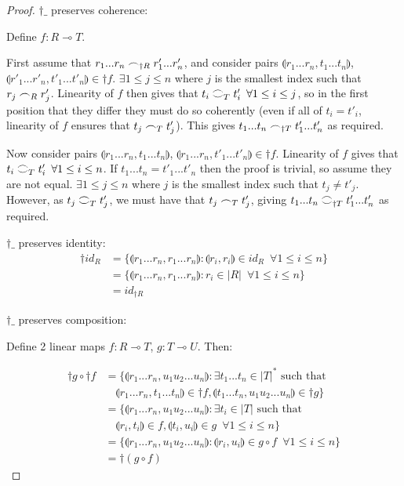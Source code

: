 \documentclass[11pt, oneside]{article}
\theoremstyle{plain}
\theoremstyle{definition}
\let\originaldagger\dagger
\renewcommand{\dag}{\mathord{\originaldagger}}
\newcommand{\lp}{\llparenthesis}
\newcommand{\rp}{\rrparenthesis}
\newcommand{\coh}[1][]{\mathrel{\vcenter{\offinterlineskip\hbox{$\frown$}\vskip0.2ex\hbox{$\smile$}}_{\ifx\\#1\\\else#1\fi}}}
\newcommand{\scoh}[1][]{\mathrel{\frown}_{\ifx\\#1\\\else#1\fi}}
\newcommand{\comp}{\mathbin{\circ}}
\begin{document}
\begin{proof}

    $\dag\_$ preserves coherence:
    \begin{adjustwidth}{1.5em}{}
        Define $f:R\multimap T$.

        First assume that $r_1...r_n\scoh[\dag R]r'_1...r'_n$, and consider pairs $\lp r_1...r_n,t_1...t_n\rp$, $\lp r'_1...r'_n,t'_1...t'_n\rp\in\dag f$.
        $\exists 1\le j\le n$ where $j$ is the smallest index such that $r_j\scoh[R]r'_j$.
        Linearity of $f$ then gives that $t_i\coh[T]t'_i\enspace\forall 1\le i\le j$, so in the first position that they differ they must do so coherently 
        (even if all of $t_i=t'_i$, linearity of $f$ ensures that $t_j\scoh[T]t'_j$).
        This gives $t_1...t_n\scoh[\dag T]t'_1...t'_n$ as required.

        Now consider pairs $\lp r_1...r_n,t_1...t_n\rp$, $\lp r_1...r_n,t'_1...t'_n\rp\in\dag f$.
        Linearity of $f$ gives that $t_i\coh[T]t'_i\enspace\forall1\le i\le n$.
        If $t_1...t_n=t'_1...t'_n$ then the proof is trivial, so assume they are not equal.
        $\exists 1\le j\le n$ where $j$ is the smallest index such that $t_j\neq t'_j$.
        However, as $t_j\coh[T]t'_j$, we must have that $t_j\scoh[T]t'_j$, giving $t_1...t_n\coh[\dag T]t'_1...t'_n$ as required.
    \end{adjustwidth}

    $\dag\_$ preserves identity:
    \begin{align*}
        \dag id_{R} &= \{\lp r_1...r_n,r_1...r_n\rp:\lp r_i,r_i\rp\in id_R\enspace\forall 1\le i\le n\} \\
        &= \{\lp r_1...r_n,r_1...r_n\rp:r_i\in |R|\enspace\forall 1\le i\le n\} \\
        &= id_{\dag R}
    \end{align*}

    $\dag\_$ preserves composition:
    \begin{adjustwidth}{1.5em}{}
        Define 2 linear maps $f:R\multimap T$, $g:T\multimap U$. Then:
    \end{adjustwidth}
    \begin{align*}
        \dag g\comp \dag f &= \{\lp r_1...r_n,u_1u_2...u_n\rp:\exists t_1...t_n\in|T|^* \text{ such that } \\
        &\quad\lp r_1...r_n,t_1...t_n\rp\in\dag f, \lp t_1...t_n,u_1u_2...u_n\rp\in\dag g\} \\
        &= \{\lp r_1...r_n,u_1u_2...u_n\rp:\exists t_i\in|T|\text{ such that } \\
        &\quad\lp r_i,t_i\rp\in f,\lp t_i,u_i\rp\in g\enspace\forall 1\le i\le n\} \\
        &= \{\lp r_1...r_n,u_1u_2...u_n\rp:\lp r_i,u_i\rp\in g\comp f \enspace\forall 1\le i\le n\} \\
        &= \dag(g\comp f)
    \end{align*}

\end{proof}
\end{document}
